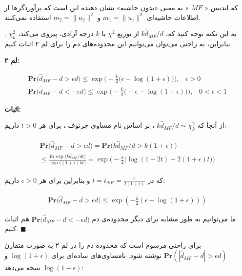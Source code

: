 که اندیس «
$MF$
» به معنی «بدون حاشیه»%
نشان دهنده این است که برآوردگرها از اطلاعات حاشیه‌ای 
$m_1 = \| u_1 \|^2$
و 
$m_2 = \| u_2 \|^2$
استفاده نمی‌کنند.

به این نکته توجه کنید که، 
$k \hat{d}_{MF} / d$
از توزیع 
$\chi^2$
با 
$k$
درجه آزادی، پیروی می‌کند،
$\chi_k^2$
. بنابراین، به راحتی می‌توان می‌توانیم این محدوده‌‌های دم را برای لم ۲ اثبات کنیم.

\textbf{
لم ۲:
}

\begin{align}
\mathbf{Pr} \big( \hat{d}_{MF} - d > \epsilon d) \leq \exp \Bigg( - \frac{k}{2} \big( \epsilon - \log( 1+ \epsilon) \big) \Bigg), \;\;\; \epsilon > 0 
\label{eq:1iE} \\
\mathbf{Pr} \big( \hat{d}_{MF} - d < -\epsilon d) \leq \exp \Bigg( - \frac{k}{2} \big( -\epsilon - \log( 1 - \epsilon) \big) \Bigg), \;\;\; 0 < \epsilon < 1 
\label{eq:1iF} 
\end{align}

\textbf{
اثبات:
}

از آنجا که 
$k \hat{d}_{MF} / d \sim \chi_k^2 $
، بر اساس نام مساوی چرنوف%
\cite{litez46}
، برای هر 
$t > 0$ 
داریم:

\begin{align}
\begin{split}
\mathbf{Pr} \big( \hat{d}_{MF} - d > \epsilon d) = 
\mathbf{Pr} \big( k \hat{d}_{MF} / d > k(1+\epsilon) \big) \\
\leq 
\frac{E\bigg( \exp (k \hat{d}_{MF} /dt \bigg) }{\exp \big( (1+\epsilon ) kt \big) } =
\exp \Bigg( - \frac{k}{2} \big( \log (1-2t) + 2(1 + \epsilon) t \big) \Bigg)
\end{split}
\label{eq:1iG}
\end{align}

که در 
$t = t_{NR} = \frac{\epsilon}{2(1+\epsilon)}$
و بنابراین برای هر 
$\epsilon > 0$
داریم:

\begin{align}
\mathbf{Pr} \big( \hat{d}_{MF} - d > \epsilon d) \leq \exp \left( -\frac{k}{2} \left( \epsilon - \log \left( 1 + \epsilon \right) \right) \right)
\label{eq:1iH}
\end{align}

ما می‌توانیم به طور مشابه برای دیگر محدوده‌ی دم 
$\mathbf{Pr} \big( \hat{d}_{MF} - d < -\epsilon d)$
هم اثبات کنیم.
$\blacksquare$

\bigskip

برای راحتی مرسوم است که محدوده دم را در لم ۲ به صورت متقارن 
$\mathbf{Pr} \left( \left| \hat{d}_{MF} - d \right| > \epsilon d \right)$
نوشته شود. نامساوی‌های ساده‌ای برای 
$\log(1+\epsilon)$
و 
$\log(1-\epsilon)$
نتیجه می‌دهد:


